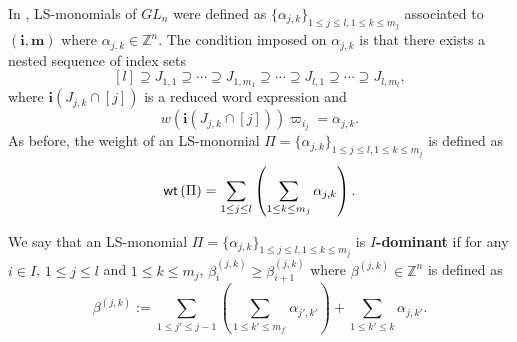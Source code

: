 \documentclass[12pt]{amsart}
\theoremstyle{definition}
\theoremstyle{remark}
\newcommand{\Z}{\mathbb{Z}}
\begin{document}
In \citep{MR1644050}, LS-monomials of $GL_n$ were defined as $\{ \alpha_{j,k}\}_{1 \leq j \leq l, 1 \leq k \leq m_j}$ associated to $(\mathbf{i}, \mathbf{m})$ where $\alpha_{j,k} \in \Z^n$. The condition imposed on $\alpha_{j,k}$ is that there exists a nested sequence of index sets
\begin{equation}\label{eqn4.4}
[l] \supseteq J_{1,1} \supseteq \cdots \supseteq J_{1, m_1} \supseteq \cdots \supseteq J_{l,1} \supseteq \cdots \supseteq J_{l,m_l},
\end{equation}
where $\mathbf{i}(J_{j,k}\cap[j])$ is a reduced word expression and
\begin{equation}\label{eqn4.5}
w(\mathbf{i}(J_{j,k}\cap [j])) \varpi_{i_j}= \alpha_{j,k}.
\end{equation}
As before, the weight of an LS-monomial $\Pi = \{ \alpha_{j,k}\}_{1 \leq j \leq l, 1 \leq k \leq m_j}$ is defined as
\begin{equation}\label{eqn4.7}
{\sf wt}\left( \Pi \right) = \sum_{1 \leq j \leq l} \left( \sum_{1 \leq k \leq m_j} \alpha_{j,k} \right).
\end{equation}

We say that an LS-monomial $\Pi = \{ \alpha_{j,k} \}_{1 \leq j \leq l, 1 \leq k \leq m_j} $ is \textbf{$I$-dominant} if for any $i \in I$, $1 \leq j \leq l$ and $1 \leq k \leq m_j$, $\beta_i^{(j,k)} \geq \beta_{i+1}^{(j,k)}$ where $\beta^{(j,k)} \in \Z^n$ is defined as
\begin{equation}\label{eqn4.6}
\beta^{(j,k)}:= \sum_{1 \leq j' \leq j-1} \left( \sum_{1 \leq k' \leq m_{j'}} \alpha_{j',k'} \right)+ \sum_{1 \leq k' \leq k} \alpha_{j,k'}.
\end{equation}
\end{document}
